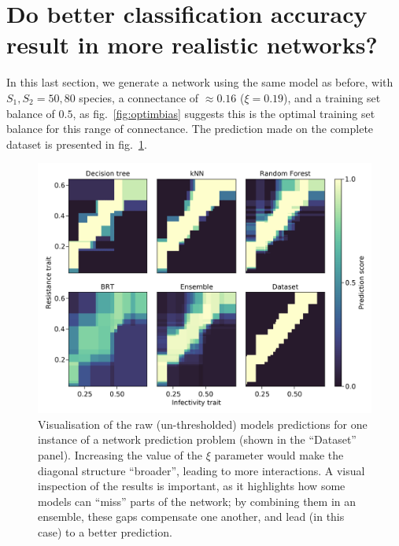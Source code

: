 \documentclass[11pt]{article}
\makeatletter
\def\maxwidth{\ifdim\Gin@nat@width>\linewidth\linewidth
\else\Gin@nat@width\fi}
\let\Oldincludegraphics\includegraphics
\renewcommand{\includegraphics}[1]{\Oldincludegraphics[width=\maxwidth]{#1}}
\makeatother
\begin{document}
\hypertarget{do-better-classification-accuracy-result-in-more-realistic-networks}{%
\section{Do better classification accuracy result in more realistic
networks?}\label{do-better-classification-accuracy-result-in-more-realistic-networks}}

In this last section, we generate a network using the same model as
before, with \(S_1, S_2 = 50, 80\) species, a connectance of
\(\approx 0.16\) (\(\xi = 0.19\)), and a training set balance of
\(0.5\), as fig.~\ref{fig:optimbias} suggests this is the optimal
training set balance for this range of connectance. The prediction made
on the complete dataset is presented in fig.~\ref{fig:ecovalid}.

\begin{figure}
\hypertarget{fig:ecovalid}{%
\centering
\includegraphics{figures/valid_ensemble.png}
\caption{Visualisation of the raw (un-thresholded) models predictions
for one instance of a network prediction problem (shown in the
``Dataset'' panel). Increasing the value of the \(\xi\) parameter would
make the diagonal structure ``broader'', leading to more interactions. A
visual inspection of the results is important, as it highlights how some
models can ``miss'' parts of the network; by combining them in an
ensemble, these gaps compensate one another, and lead (in this case) to
a better prediction.}\label{fig:ecovalid}
}
\end{figure}
\end{document}
